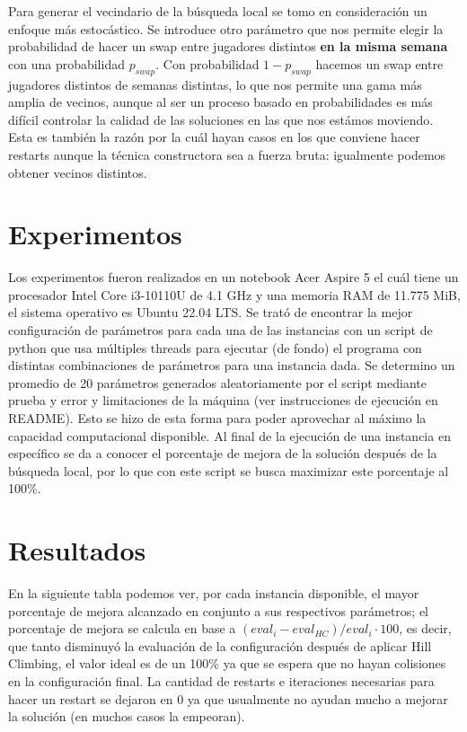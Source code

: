 \documentclass[letter, 10pt]{article}
\begin{document}
Para generar el vecindario de la búsqueda local se tomo en consideración un enfoque más estocástico. Se introduce otro parámetro que nos permite elegir la probabilidad de hacer un swap entre jugadores distintos \textbf{en la misma semana} con una probabilidad $p_{swap}$. Con probabilidad $1-p_{swap}$ hacemos un swap entre jugadores distintos de semanas distintas, lo que nos permite una gama más amplia de vecinos, aunque al ser un proceso basado en probabilidades es más difícil controlar la calidad de las soluciones en las que nos estámos moviendo. Esta es también la razón por la cuál hayan casos en los que conviene hacer restarts aunque la técnica constructora sea a fuerza bruta: igualmente podemos obtener vecinos distintos.

\section{Experimentos} \label{exps}

Los experimentos fueron realizados en un notebook Acer Aspire 5 el cuál tiene un procesador Intel Core i3-10110U de 4.1 GHz y una memoria RAM de 11.775 MiB, el sistema operativo es Ubuntu 22.04 LTS. Se trató de encontrar la mejor configuración de parámetros para cada una de las instancias con un script de python que usa múltiples threads para ejecutar (de fondo) el programa con distintas combinaciones de parámetros para una instancia dada. Se determino un promedio de 20 parámetros generados aleatoriamente por el script mediante prueba y error y limitaciones de la máquina (ver instrucciones de ejecución en README). Esto se hizo de esta forma para poder aprovechar al máximo la capacidad computacional disponible. Al final de la ejecución de una instancia en específico se da a conocer el porcentaje de mejora de la solución después de la búsqueda local, por lo que con este script se busca maximizar este porcentaje al 100\%.  

\section{Resultados} \label{results}

En la siguiente tabla podemos ver, por cada instancia disponible, el mayor porcentaje de mejora alcanzado en conjunto a sus respectivos parámetros; el porcentaje de mejora se calcula en base a $(eval_i - eval_{HC}) / eval_i \cdot 100$, es decir, que tanto disminuyó la evaluación de la configuración después de aplicar Hill Climbing, el valor ideal es de un 100\% ya que se espera que no hayan colisiones en la configuración final. La cantidad de restarts e iteraciones necesarias para hacer un restart se dejaron en 0 ya que usualmente no ayudan mucho a mejorar la solución (en muchos casos la empeoran).
\end{document}
